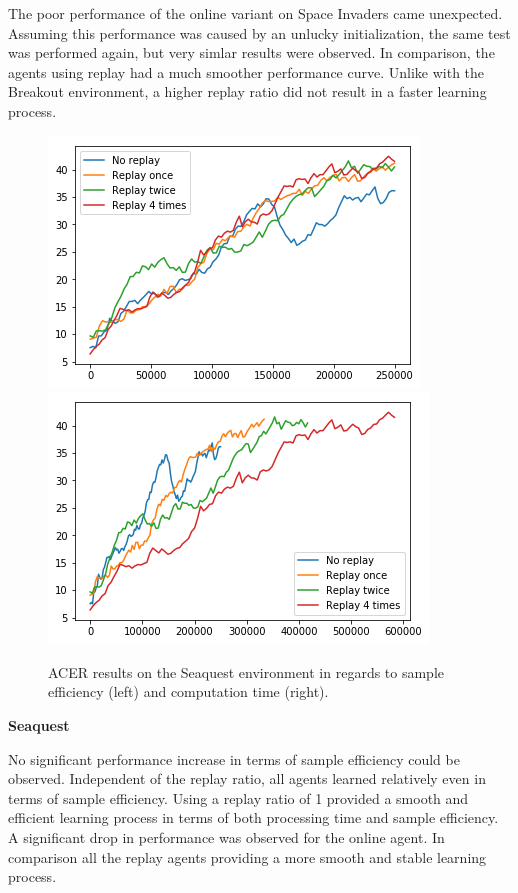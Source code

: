 The poor performance of the online variant on Space Invaders came unexpected. Assuming this performance was caused by an unlucky initialization, the same test was performed again, but very simlar results were observed. In comparison, the agents using replay had a much smoother performance curve.
Unlike with the Breakout environment, a higher replay ratio did not result in a faster learning process.
\begin{figure}[h]
\includegraphics[scale=0.55]{bilder/seaquestbyonline.png}
\includegraphics[scale=0.55]{bilder/seaquestbytime.png}
\caption{ACER results on the Seaquest environment in regards to sample efficiency (left) and computation time (right).}
\label{seafig}
\end{figure}

\textbf{Seaquest}

No significant performance increase in terms of sample efficiency could be observed. Independent of the replay ratio, all agents learned relatively even in terms of sample efficiency.
Using a replay ratio of 1 provided a smooth and efficient learning process in terms of both processing time and sample efficiency. \linebreak A significant drop in performance was observed for the online agent. In comparison all the replay agents providing a more smooth and stable learning process.
 

